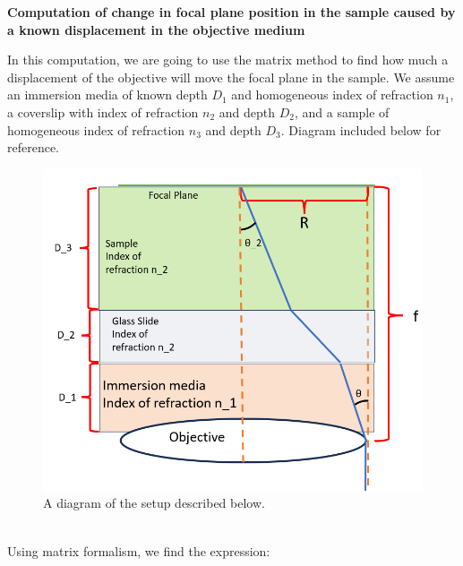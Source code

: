 \newpage
\begin{center}
    \textbf{Computation of change in focal plane position in the sample caused by a known displacement in the objective medium}\\
\end{center}
In this computation, we are going to use the matrix method to find how much a displacement of the objective will move the focal plane in the sample. We assume an immersion media of known depth $D_1$ and homogeneous index of refraction $n_1$, a coverslip with index of refraction $n_2$ and depth $D_2$, and a sample of homogeneous index of refraction $n_3$ and depth $D_3$. Diagram included below for reference.
\begin{figure}[h]
    \centering
    \includegraphics[width=0.7\linewidth]{image3.png}
    \caption{A diagram of the setup described below.}
    \label{fig:enter-label}
\end{figure}
\\Using matrix formalism, we find the expression:
